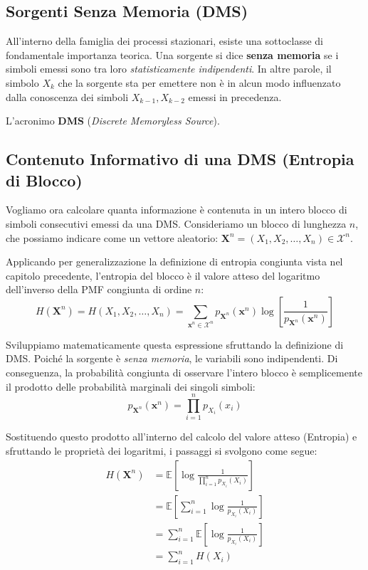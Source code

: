\subsection{Sorgenti Senza Memoria (DMS)}

All'interno della famiglia dei processi stazionari, esiste una sottoclasse di fondamentale importanza teorica. 
Una sorgente si dice \textbf{senza memoria} se i simboli emessi sono tra loro \textit{statisticamente indipendenti}. In altre parole, il simbolo $X_k$ che la sorgente sta per emettere non è in alcun modo influenzato dalla conoscenza dei simboli $X_{k-1}, X_{k-2}$ emessi in precedenza. 

L'acronimo \textbf{DMS} (\textit{Discrete Memoryless Source}).

\subsection{Contenuto Informativo di una DMS (Entropia di Blocco)}

Vogliamo ora calcolare quanta informazione è contenuta in un intero blocco di simboli consecutivi emessi da una DMS. 
Consideriamo un blocco di lunghezza $n$, che possiamo indicare come un vettore aleatorio: $\mathbf{X}^n = (X_1, X_2, \dots, X_n) \in \mathcal{X}^n$.

Applicando per generalizzazione la definizione di entropia congiunta vista nel capitolo precedente, l'entropia del blocco è il valore atteso del logaritmo dell'inverso della PMF congiunta di ordine $n$:
\begin{equation}
    H(\mathbf{X}^n) = H(X_1, X_2, \dots, X_n) = \sum_{\mathbf{x}^n \in \mathcal{X}^n} p_{\mathbf{X}^n}(\mathbf{x}^n) \log \left[ \frac{1}{p_{\mathbf{X}^n}(\mathbf{x}^n)} \right]
\end{equation}

Sviluppiamo matematicamente questa espressione sfruttando la definizione di DMS. Poiché la sorgente è \textit{senza memoria}, le variabili sono indipendenti. Di conseguenza, la probabilità congiunta di osservare l'intero blocco è semplicemente il prodotto delle probabilità marginali dei singoli simboli:
\begin{equation}
    p_{\mathbf{X}^n}(\mathbf{x}^n) = \prod_{i=1}^{n} p_{X_i}(x_i)
\end{equation}

Sostituendo questo prodotto all'interno del calcolo del valore atteso (Entropia) e sfruttando le proprietà dei logaritmi, i passaggi si svolgono come segue:
\begin{align}
    H(\mathbf{X}^n) &= \mathbb{E} \left[ \log \frac{1}{\prod_{i=1}^{n} p_{X_i}(X_i)} \right] \nonumber \\
                    &= \mathbb{E} \left[ \sum_{i=1}^{n} \log \frac{1}{p_{X_i}(X_i)} \right] \nonumber \\
                    &= \sum_{i=1}^{n} \mathbb{E} \left[ \log \frac{1}{p_{X_i}(X_i)} \right] \nonumber \\
                    &= \sum_{i=1}^{n} H(X_i)
\end{align}

